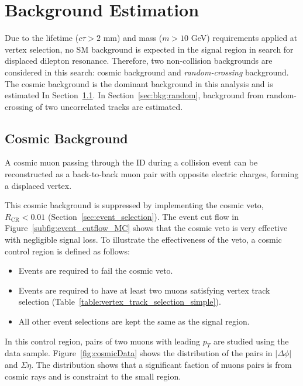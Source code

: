 \chapter{Background Estimation}
\label{chap:bkg}

Due to the lifetime ($c\tau > 2$ mm) and mass ($m > 10$ GeV) requirements applied at vertex selection, no SM background is expected in the signal region in search for displaced dilepton resonance. Therefore, two non-collision backgrounds are considered in this search: cosmic background and \textit{random-crossing} background. The cosmic background is the dominant background in this analysis and is estimated In Section~\ref{sec:bkg:cosmic}. In Section~\ref{sec:bkg:random}, background from random-crossing of two uncorrelated tracks are estimated.


\section{Cosmic Background}
\label{sec:bkg:cosmic}

A cosmic muon passing through the ID during a collision event can be reconstructed as a back-to-back muon pair with opposite electric charges, forming a displaced \mumu vertex.

This cosmic background is suppressed by implementing the cosmic veto, $R_{\mathrm{CR}} < 0.01$ (Section~\ref{sec:event_selection}). The event cut flow in Figure~\ref{subfig:event_cutflow_MC} shows that the cosmic veto is very effective with negligible signal loss. To illustrate the effectiveness of the veto, a cosmic control region is defined as follows:

\begin{itemize}
  \item Events are required to fail the cosmic veto.
  \item Events are required to have at least two muons satisfying vertex track selection (Table~\ref{table:vertex_track_selection_simple}).
  \item All other event selections are kept the same as the signal region.
\end{itemize}

In this control region, pairs of two muons with leading $p_{T}$ are studied using the data sample. Figure~\ref{fig:cosmicData} shows the distribution of the pairs in $|\Delta\phi|$ and $\Sigma \eta$. The distribution shows that a significant faction of muons pairs is from cosmic rays and is constraint to the small \Rcr region.

